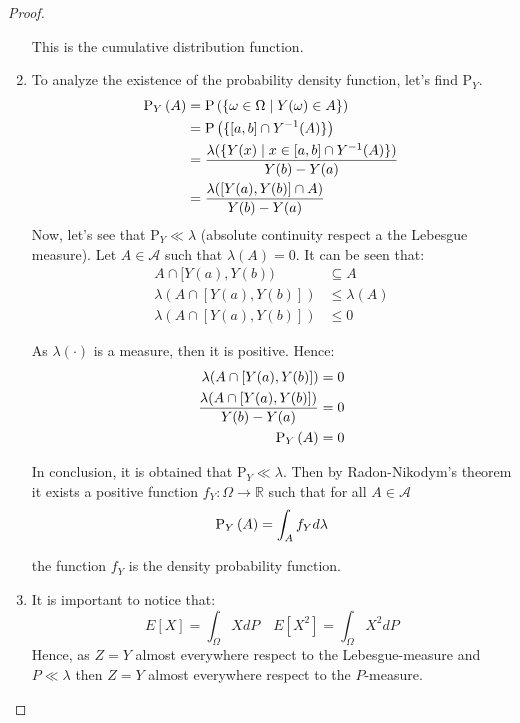\documentclass[11pt]{article}
\theoremstyle{definition}
\theoremstyle{remark}
\theoremstyle{remark}
\newcommand{\R}{{\mathbb{R}}}
\begin{document}
\begin{proof}
\begin{enumerate}[label=\alph*)]
      This is the cumulative distribution function.

    \item To analyze the existence of the probability density
      function, let's find $\mathrm{P}_Y$.
      \begin{align*}
        \P[Y]{A} &= \P{\{\omega \in \Omega \mid Y(\omega) \in A\}} \\
                 &= \P{\{[a, b]\cap Y^{-1}(A)\}} \\
                 &= \frac{\lambda(\{Y(x) \mid x \in [a,b]\cap Y^{-1}(A)\})}{Y(b) - Y(a)} \\
                 &= \frac{\lambda([Y(a), Y(b)] \cap A)}{Y(b) - Y(a)}
      \end{align*}
      Now, let's see that $\mathrm{P}_Y \ll \lambda$ (absolute
      continuity respect a the Lebesgue measure). Let
      $A \in \mathcal{A}$ such that $\lambda(A) = 0$. It can be seen
      that:
      \begin{align*}
        A \cap [Y(a), Y(b)) &\subseteq A \\
        \lambda(A \cap  [Y(a), Y(b)]) &\le \lambda(A) \\
        \lambda(A \cap [Y(a), Y(b)]) &\le 0
      \end{align*}

      As $\lambda(\cdot)$ is a measure, then it is positive. Hence:
      \begin{align*}
        \lambda(A \cap [Y(a), Y(b)]) &= 0 \\
        \frac{\lambda(A \cap [Y(a), Y(b)])}{Y(b) - Y(a)} &= 0 \\
        \P[Y]{A} &= 0
      \end{align*}

      In conclusion, it is obtained that
      $\mathrm{P}_Y \ll \lambda$. Then by Radon-Nikodym's theorem
      it exists a positive function $f_Y : \Omega \rightarrow \R$
      such that for all $A \in \mathcal{A}$
      \begin{equation*}
        \P[Y]{A} = \int_A f_Y d\lambda
      \end{equation*}

      the function $f_Y$ is the density probability function.

    \item It is important to notice that:
      \begin{equation*}
        E[X] = \int_\Omega X dP \quad E[X^2] = \int_\Omega X^2 dP
      \end{equation*}
      Hence, as $Z = Y$ almost everywhere respect to the
      Lebesgue-measure and $P \ll \lambda$ then $Z=Y$ almost
      everywhere respect to the $P$-measure.


\end{enumerate}
\end{proof}
\end{document}
